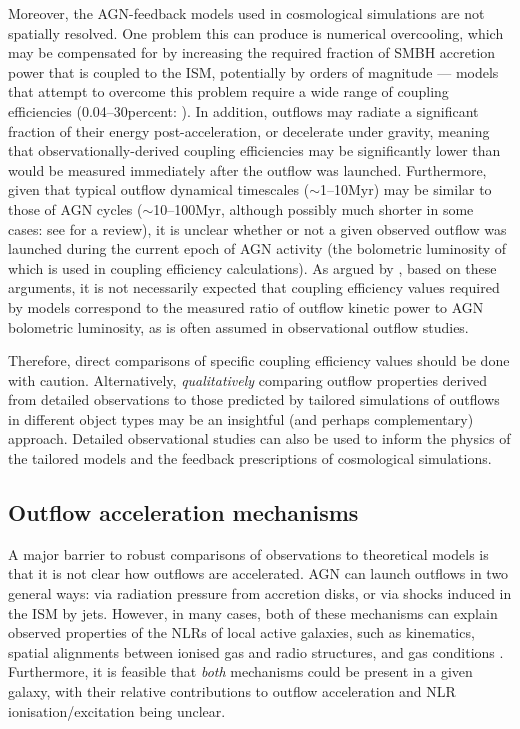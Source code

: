 Moreover, the AGN-feedback models used in cosmological simulations are not spatially resolved. One problem this can produce is numerical overcooling, which may be compensated for by increasing the required fraction of SMBH accretion power that is coupled to the ISM, potentially by orders of magnitude \citep{Weinberger2017} --- models that attempt to overcome this problem require a wide range of coupling efficiencies (0.04--30\;per\;cent: \citealt{Booth2009, Choi2012}). In addition, outflows may radiate a significant fraction of their energy post-acceleration, or decelerate under gravity, meaning that observationally-derived coupling efficiencies may be significantly lower than would be measured immediately after the outflow was launched. Furthermore, given that typical outflow dynamical timescales ($\sim$1--10\;Myr) may be similar to those of AGN cycles ($\sim$10--100\;Myr, although possibly much shorter in some cases: see \citealt{Morganti2017} for a review), it is unclear whether or not a given observed outflow was launched during the current epoch of AGN activity (the bolometric luminosity of which is used in coupling efficiency calculations). As argued by \citet{Harrison2018}, based on these arguments, it is not necessarily expected that coupling efficiency values required by models correspond to the measured ratio of outflow kinetic power to AGN bolometric luminosity, as is often assumed in observational outflow studies.

Therefore, direct comparisons of specific coupling efficiency values should be done with caution. Alternatively, \textit{qualitatively} comparing outflow properties derived from detailed observations to those predicted by tailored simulations of outflows in different object types may be an insightful (and perhaps complementary) approach. Detailed observational studies can also be used to inform the physics of the tailored models and the feedback prescriptions of cosmological simulations.


\subsection{Outflow acceleration mechanisms}
\label{section: introduction: outflows: acceleration_mechanisms}

A major barrier to robust comparisons of observations to theoretical models is that it is not clear how outflows are accelerated. AGN can launch outflows in two general ways: via radiation pressure from accretion disks, or via shocks induced in the ISM by jets. However, in many cases, both of these mechanisms can explain observed properties of the NLRs of local active galaxies, such as kinematics, spatial alignments between ionised gas and radio structures, and gas conditions \citep{Ulvestad1981, Wilson1985, Whittle1988, Cecil1990, Capetti1995a, Capetti1995b, Axon1998, Crenshaw2000_N1068, Crenshaw2000_N4151, Das2005, Das2006, Mukherjee2016, Mukherjee2018, Meena2021}. Furthermore, it is feasible that \textit{both} mechanisms could be present in a given galaxy, with their relative contributions to outflow acceleration and NLR ionisation/excitation being unclear.

